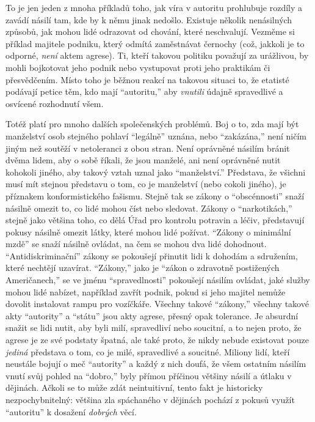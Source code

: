\documentclass{book}
\begin{document}
To je jen jeden z mnoha příkladů toho, jak víra v autoritu prohlubuje rozdíly a zavádí násilí tam, kde by k němu jinak nedošlo. Existuje několik nenásilných způsobů, jak mohou lidé odrazovat od chování, které neschvalují. Vezměme si příklad majitele podniku, který odmítá zaměstnávat černochy (což, jakkoli je to odporné, \emph{není} aktem agrese). Ti, kteří takovou politiku považují za urážlivou, by mohli bojkotovat jeho podnik nebo vystupovat proti jeho praktikám či přesvědčením. Místo toho je běžnou reakcí na takovou situaci to, že etatisté podávají petice těm, kdo mají \enquote{autoritu,} aby \emph{vnutili} údajně spravedlivé a osvícené rozhodnutí všem.

Totéž platí pro mnoho dalších společenských problémů. Boj o to, zda mají být manželství osob stejného pohlaví \enquote{legálně} uznána, nebo \enquote{zakázána,} není ničím jiným než soutěží v netoleranci z obou stran. Není oprávněné násilím bránit dvěma lidem, aby o sobě říkali, že jsou manželé, ani není oprávněné nutit kohokoli jiného, aby takový vztah uznal jako \enquote{manželství.} Představa, že všichni musí mít stejnou představu o tom, co je manželství (nebo cokoli jiného), je příznakem konformistického fašismu. Stejně tak se zákony o \enquote{obscénnosti} snaží násilně omezit to, co lidé mohou číst nebo sledovat. Zákony o \enquote{narkotikách,} stejně jako většina toho, co dělá Úřad pro kontrolu potravin a léčiv, představují pokusy násilně omezit látky, které mohou lidé požívat. \enquote{Zákony o minimální mzdě} se snaží násilně ovládat, na čem se mohou dva lidé dohodnout. \enquote{Antidiskriminační} zákony se pokoušejí přinutit lidi k dohodám a sdružením, které nechtějí uzavírat. \enquote{Zákony,} jako je \enquote{zákon o zdravotně postižených Američanech,} se ve jménu \enquote{spravedlnosti} pokoušejí násilím ovládat, jaké služby mohou lidé nabízet, například zavřít podnik, pokud si jeho majitel nemůže dovolit instalovat rampu pro vozíčkáře. Všechny takové \enquote{zákony,} všechny takové akty \enquote{autority} a \enquote{státu} jsou akty agrese, přesný opak tolerance. Je absurdní snažit se lidi nutit, aby byli milí, spravedliví nebo soucitní, a to nejen proto, že agrese je ze své podstaty špatná, ale také proto, že nikdy nebude existovat pouze \emph{jediná} představa o tom, co je milé, spravedlivé a soucitné. Miliony lidí, kteří neustále bojují o meč \enquote{autority} a každý z nich doufá, že všem ostatním násilím vnutí svůj pohled na \enquote{dobro,} byly přímou příčinou většiny násilí a útlaku v dějinách. Ačkoli se to může zdát neintuitivní, tento fakt je historicky nezpochybnitelný: většina zla spáchaného v dějinách pochází z pokusů využít \enquote{autoritu} k dosažení \emph{dobrých} věcí.
\end{document}
